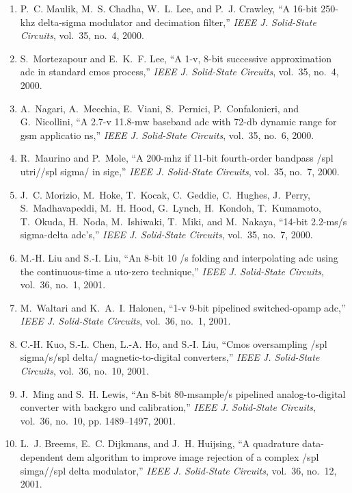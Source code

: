 \begin{enumerate}
\item
P.~C. Maulik, M.~S. Chadha, W.~L. Lee, and P.~J. Crawley, ``A 16-bit 250-khz
  delta-sigma modulator and decimation filter,'' \emph{{IEEE} J. Solid-State
  Circuits}, vol.~35, no.~4, 2000.

\item
S.~Mortezapour and E.~K.~F. Lee, ``A 1-v, 8-bit successive approximation adc in
  standard cmos process,'' \emph{{IEEE} J. Solid-State Circuits}, vol.~35,
  no.~4, 2000.

\item
A.~Nagari, A.~Mecchia, E.~Viani, S.~Pernici, P.~Confalonieri, and G.~Nicollini,
  ``A 2.7-v 11.8-mw baseband adc with 72-db dynamic range for gsm applicatio
  ns,'' \emph{{IEEE} J. Solid-State Circuits}, vol.~35, no.~6, 2000.

\item
R.~Maurino and P.~Mole, ``A 200-mhz if 11-bit fourth-order bandpass /spl
  utri//spl sigma/ in sige,'' \emph{{IEEE} J. Solid-State Circuits}, vol.~35,
  no.~7, 2000.

\item
J.~C. Morizio, M.~Hoke, T.~Kocak, C.~Geddie, C.~Hughes, J.~Perry,
  S.~Madhavapeddi, M.~H. Hood, G.~Lynch, H.~Kondoh, T.~Kumamoto, T.~Okuda,
  H.~Noda, M.~Ishiwaki, T.~Miki, and M.~Nakaya, ``14-bit 2.2-ms/s sigma-delta
  adc's,'' \emph{{IEEE} J. Solid-State Circuits}, vol.~35, no.~7, 2000.

\item
M.-H. Liu and S.-I. Liu, ``An 8-bit 10 /s folding and interpolating adc using
  the continuous-time a uto-zero technique,'' \emph{{IEEE} J. Solid-State
  Circuits}, vol.~36, no.~1, 2001.

\item
M.~Waltari and K.~A.~I. Halonen, ``1-v 9-bit pipelined switched-opamp adc,''
  \emph{{IEEE} J. Solid-State Circuits}, vol.~36, no.~1, 2001.

\item
C.-H. Kuo, S.-L. Chen, L.-A. Ho, and S.-I. Liu, ``Cmos oversampling /spl
  sigma/s/spl delta/ magnetic-to-digital converters,'' \emph{{IEEE} J.
  Solid-State Circuits}, vol.~36, no.~10, 2001.

\item
J.~Ming and S.~H. Lewis, ``An 8-bit 80-msample/s pipelined analog-to-digital
  converter with backgro und calibration,'' \emph{{IEEE} J. Solid-State
  Circuits}, vol.~36, no.~10, pp. 1489--1497, 2001.

\item
L.~J. Breems, E.~C. Dijkmans, and J.~H. Huijsing, ``A quadrature data-dependent
  dem algorithm to improve image rejection of a complex /spl simga//spl delta
  modulator,'' \emph{{IEEE} J. Solid-State Circuits}, vol.~36, no.~12, 2001.


\end{enumerate}
